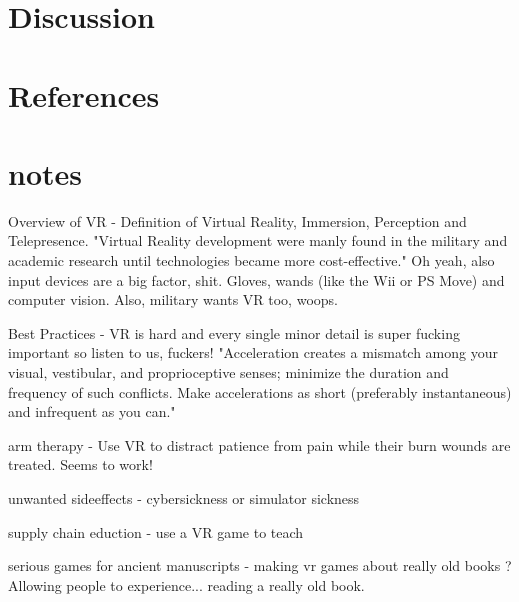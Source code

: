 \documentclass[11pt]{report}
\begin{document}
\chapter{Discussion}



\chapter{References}





\chapter{notes}
Overview of VR - Definition of Virtual Reality, Immersion, Perception and Telepresence. 
"Virtual Reality development were manly found in the military and academic research until technologies became more cost-effective."
Oh yeah, also input devices are a big factor, shit. Gloves, wands (like the Wii or PS Move) and computer vision.
Also, military wants VR too, woops.
	
Best Practices - VR is hard and every single minor detail is super fucking important so listen to us, fuckers!
"Acceleration creates a mismatch among your visual, vestibular, and proprioceptive senses;
minimize the duration and frequency of such conflicts. Make accelerations as short (preferably
instantaneous) and infrequent as you can."

arm therapy - Use VR to distract patience from pain while their burn wounds are treated. Seems to work!

unwanted sideeffects - cybersickness or simulator sickness

supply chain eduction - use a VR game to teach

serious games for ancient manuscripts - making vr games about really old books ? Allowing people to experience... reading a really old book. \cite{zyda05}
\end{document}
